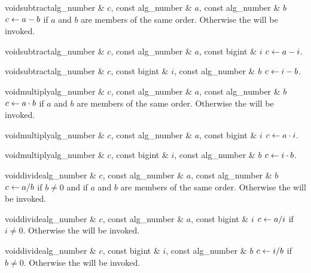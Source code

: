 \begin{fcode}{void}{subtract}{alg_number & $c$, const alg_number & $a$, const alg_number & $b$}
  $c \leftarrow a - b$ if $a$ and $b$ are members of the same order.  Otherwise the \LEH will be
  invoked.
\end{fcode}

\begin{fcode}{void}{subtract}{alg_number & $c$, const alg_number & $a$, const bigint & $i$}
  $c \leftarrow a - i$.
\end{fcode}

\begin{fcode}{void}{subtract}{alg_number & $c$, const bigint & $i$, const alg_number & $b$}
  $c \leftarrow i - b$.
\end{fcode}

\begin{fcode}{void}{multiply}{alg_number & $c$, const alg_number & $a$, const alg_number & $b$}
  $c \leftarrow a \cdot b$ if $a$ and $b$ are members of the same order.  Otherwise the \LEH will
  be invoked.
\end{fcode}

\begin{fcode}{void}{multiply}{alg_number & $c$, const alg_number & $a$, const bigint & $i$}
  $c \leftarrow a \cdot i$.
\end{fcode}

\begin{fcode}{void}{multiply}{alg_number & $c$, const bigint & $i$, const alg_number & $b$}
  $c \leftarrow i \cdot b$.
\end{fcode}

\begin{fcode}{void}{divide}{alg_number & $c$, const alg_number & $a$, const alg_number & $b$}
  $c \leftarrow a / b$ if $b \neq 0$ and if $a$ and $b$ are members of the same order.  Otherwise
  the \LEH will be invoked.
\end{fcode}

\begin{fcode}{void}{divide}{alg_number & $c$, const alg_number & $a$, const bigint & $i$}
  $c \leftarrow a / i$ if $i \neq 0$.  Otherwise the \LEH will be invoked.
\end{fcode}

\begin{fcode}{void}{divide}{alg_number & $c$, const bigint & $i$, const alg_number & $b$}
  $c \leftarrow i / b$ if $b \neq 0$.  Otherwise the \LEH will be invoked.
\end{fcode}

